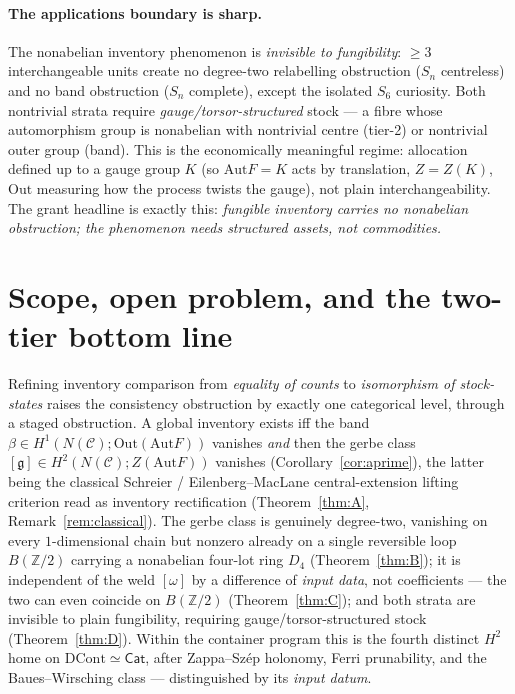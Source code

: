 \documentclass[11pt]{article}
\theoremstyle{definition}
\newcommand{\Cat}{\mathsf{Cat}}
\newcommand{\C}{\mathcal{C}}
\newcommand{\Z}{\mathbb{Z}}
\newcommand{\Aut}{\mathrm{Aut}}
\newcommand{\Out}{\mathrm{Out}}
\newcommand{\Zc}{Z}
\newcommand{\gerbe}{\mathfrak{g}}
\begin{document}
\paragraph{The applications boundary is sharp.}
The nonabelian inventory phenomenon is \emph{invisible to fungibility}: $\ge3$ interchangeable units
create no degree-two relabelling obstruction ($S_n$ centreless) and no band obstruction ($S_n$
complete), except the isolated $S_6$ curiosity. Both nontrivial strata require
\emph{gauge/torsor-structured} stock --- a fibre whose automorphism group is nonabelian with
nontrivial centre (tier-2) or nontrivial outer group (band). This is the economically meaningful
regime: allocation defined up to a gauge group $K$ (so $\Aut F=K$ acts by translation, $\Zc=Z(K)$,
$\Out$ measuring how the process twists the gauge), not plain interchangeability. The grant headline
is exactly this: \emph{fungible inventory carries no nonabelian obstruction; the phenomenon needs
structured assets, not commodities.}

\section{Scope, open problem, and the two-tier bottom line}\label{sec:conclusion}

Refining inventory comparison from \emph{equality of counts} to \emph{isomorphism of stock-states}
raises the consistency obstruction by exactly one categorical level, through a staged obstruction.
A global inventory exists iff the band $\beta\in H^1(N(\C);\Out(\Aut F))$ vanishes \emph{and} then
the gerbe class $[\gerbe]\in H^2(N(\C);Z(\Aut F))$ vanishes (Corollary~\ref{cor:aprime}),
the latter being the classical Schreier / Eilenberg--MacLane central-extension lifting criterion
read as inventory rectification (Theorem~\ref{thm:A}, Remark~\ref{rem:classical}). The gerbe class
is genuinely degree-two, vanishing on every $1$-dimensional chain but nonzero already on a single
reversible loop $B(\Z/2)$ carrying a nonabelian four-lot ring $D_4$ (Theorem~\ref{thm:B}); it is
independent of the weld $[\omega]$ by a difference of \emph{input data}, not coefficients --- the
two can even coincide on $B(\Z/2)$ (Theorem~\ref{thm:C}); and both strata are invisible to plain
fungibility, requiring gauge/torsor-structured stock (Theorem~\ref{thm:D}). Within the container
program this is the fourth distinct $H^2$ home on $\mathrm{DCont}\simeq\Cat$, after Zappa--Sz\'ep
holonomy, Ferri prunability, and the Baues--Wirsching class --- distinguished by its \emph{input
datum}.
\end{document}
